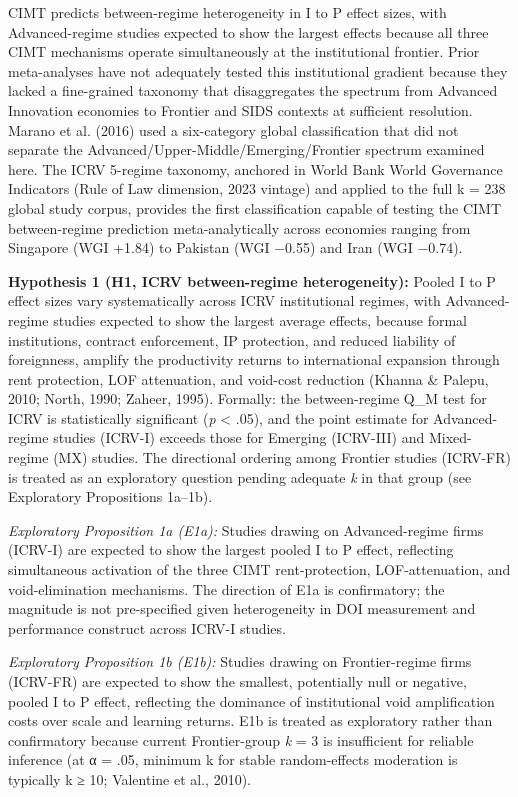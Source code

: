 \documentclass[
  12pt,a4paper]{article}
\begin{document}
CIMT predicts between-regime heterogeneity in I to P effect sizes, with
Advanced-regime studies expected to show the largest effects because all
three CIMT mechanisms operate simultaneously at the institutional
frontier. Prior meta-analyses have not adequately tested this
institutional gradient because they lacked a fine-grained taxonomy that
disaggregates the spectrum from Advanced Innovation economies to
Frontier and SIDS contexts at sufficient resolution. Marano et al.
(2016) used a six-category global classification that did not separate
the Advanced/Upper-Middle/Emerging/Frontier spectrum examined here. The
ICRV 5-regime taxonomy, anchored in World Bank World Governance
Indicators (Rule of Law dimension, 2023 vintage) and applied to the full
k = 238 global study corpus, provides the first classification capable
of testing the CIMT between-regime prediction meta-analytically across
economies ranging from Singapore (WGI +1.84) to Pakistan (WGI −0.55) and
Iran (WGI −0.74).

\textbf{Hypothesis 1 (H1, ICRV between-regime heterogeneity):} Pooled I
to P effect sizes vary systematically across ICRV institutional regimes,
with Advanced-regime studies expected to show the largest average
effects, because formal institutions, contract enforcement, IP
protection, and reduced liability of foreignness, amplify the
productivity returns to international expansion through rent protection,
LOF attenuation, and void-cost reduction (Khanna \& Palepu, 2010; North,
1990; Zaheer, 1995). Formally: the between-regime Q\_M test for ICRV is
statistically significant (\emph{p} \textless{} .05), and the point
estimate for Advanced-regime studies (ICRV-I) exceeds those for Emerging
(ICRV-III) and Mixed-regime (MX) studies. The directional ordering among
Frontier studies (ICRV-FR) is treated as an exploratory question pending
adequate \emph{k} in that group (see Exploratory Propositions 1a--1b).

\emph{Exploratory Proposition 1a (E1a):} Studies drawing on
Advanced-regime firms (ICRV-I) are expected to show the largest pooled I
to P effect, reflecting simultaneous activation of the three CIMT
rent-protection, LOF-attenuation, and void-elimination mechanisms. The
direction of E1a is confirmatory; the magnitude is not pre-specified
given heterogeneity in DOI measurement and performance construct across
ICRV-I studies.

\emph{Exploratory Proposition 1b (E1b):} Studies drawing on
Frontier-regime firms (ICRV-FR) are expected to show the smallest,
potentially null or negative, pooled I to P effect, reflecting the
dominance of institutional void amplification costs over scale and
learning returns. E1b is treated as exploratory rather than confirmatory
because current Frontier-group \emph{k} = 3 is insufficient for reliable
inference (at α = .05, minimum k for stable random-effects moderation is
typically k ≥ 10; Valentine et al., 2010).
\end{document}
